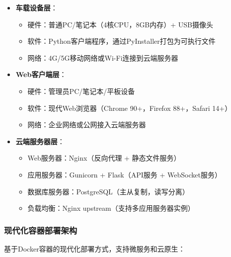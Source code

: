\documentclass[a4paper,12pt]{article}
\begin{document}
\begin{itemize}
  \item \textbf{车载设备层}：
    \begin{itemize}
      \item 硬件：普通PC/笔记本（4核CPU，8GB内存）+ USB摄像头
      \item 软件：Python客户端程序，通过PyInstaller打包为可执行文件
      \item 网络：4G/5G移动网络或Wi-Fi连接到云端服务器
    \end{itemize}
  \item \textbf{Web客户端层}：
    \begin{itemize}
      \item 硬件：管理员PC/笔记本/平板设备
      \item 软件：现代Web浏览器（Chrome 90+，Firefox 88+，Safari 14+）
      \item 网络：企业网络或公网接入云端服务器
    \end{itemize}
  \item \textbf{云端服务器层}：
    \begin{itemize}
      \item Web服务器：Nginx（反向代理 + 静态文件服务）
      \item 应用服务器：Gunicorn + Flask（API服务 + WebSocket服务）
      \item 数据库服务器：PostgreSQL（主从复制，读写分离）
      \item 负载均衡：Nginx upstream（支持多应用服务器实例）
    \end{itemize}
\end{itemize}

\subsubsection{现代化容器部署架构}
基于Docker容器的现代化部署方式，支持微服务和云原生：
\end{document}
